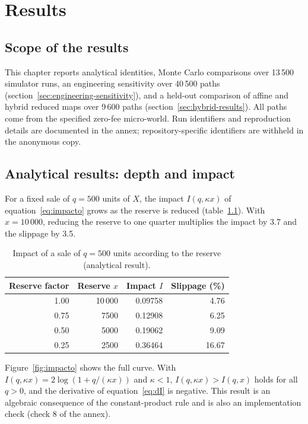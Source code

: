 \chapter{Results}
\label{cap:resultados}

\section{Scope of the results}

This chapter reports analytical identities, Monte Carlo comparisons over 13\,500 simulator runs, an engineering sensitivity over 40\,500 paths (section~\ref{sec:engineering-sensitivity}), and a held-out comparison of affine and hybrid reduced maps over 9\,600 paths (section~\ref{sec:hybrid-results}). All paths come from the specified zero-fee micro-world. Run identifiers and reproduction details are documented in the annex; repository-specific identifiers are withheld in the anonymous copy.

\section{Analytical results: depth and impact}
\label{sec:res-analitico}

For a fixed sale of $q=500$ units of $X$, the impact $I(q,\kappa x)$ of equation~\eqref{eq:impacto} grows as the reserve is reduced (table~\ref{tab:impacto}). With $x=10\,000$, reducing the reserve to one quarter multiplies the impact by 3.7 and the slippage by 3.5.

\begin{table}[htbp]
\centering
\caption{Impact of a sale of $q=500$ units according to the reserve (analytical result).}
\label{tab:impacto}
\small
\begin{tabular}{@{}rrrr@{}}
\toprule
Reserve factor & Reserve $x$ & Impact $I$ & Slippage (\%) \\
\midrule
1.00 & 10\,000 & 0.09758 & 4.76 \\
0.75 & 7500 & 0.12908 & 6.25 \\
0.50 & 5000 & 0.19062 & 9.09 \\
0.25 & 2500 & 0.36464 & 16.67 \\
\bottomrule
\end{tabular}
\end{table}

Figure~\ref{fig:impacto} shows the full curve. With $I(q,\kappa x)=2\log(1+q/(\kappa x))$ and $\kappa<1$, $I(q,\kappa x)>I(q,x)$ holds for all $q>0$, and the derivative of equation~\eqref{eq:dI} is negative. This result is an algebraic consequence of the constant-product rule and is also an implementation check (check 8 of the annex).

